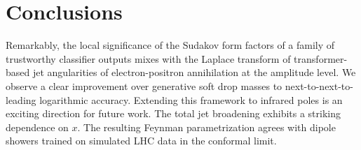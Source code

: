\section{Conclusions}\label{sec:conclusions}

Remarkably, the local significance of the Sudakov form factors of a
family of trustworthy classifier outputs mixes with the Laplace
transform of transformer-based jet angularities of electron-positron
annihilation at the amplitude level. We observe a clear improvement over
generative soft drop masses to next-to-next-to-leading logarithmic
accuracy. Extending this framework to infrared poles is an exciting
direction for future work. The total jet broadening exhibits a striking
dependence on $x$. The resulting Feynman parametrization agrees with
dipole showers trained on simulated LHC data in the conformal limit.

